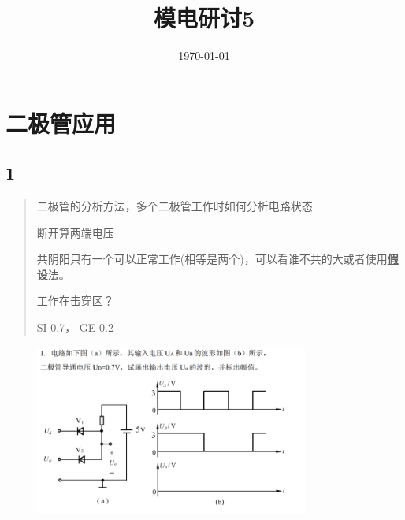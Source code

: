 \documentclass[twocolumn]{ctexart}
\title{模电研讨5}
\author{}
\date{\today}
\begin{document}
\maketitle
\newpage

\renewcommand{\baselinestretch}{1.35}
\tableofcontents
\newpage

\setlength{\parskip}{0em}
\renewcommand{\baselinestretch}{1.53}


\section{二极管应用}
\subsection{1}
\begin{quote}
{\qquad{}\ccwd\kaishu{}
二极管的分析方法，多个二极管工作时如何分析电路状态
}
\begin{description}[leftmargin=1.7cm,style=nextline,nosep]%
    \item[只有一个] 断开算两端电压
    \item[两个或者多个] 共阴阳只有一个可以正常工作(相等是两个)，可以看谁不共的大或者使用\underline{\textbf{假设}}法。
    \item[稳压二极管] 工作在击穿区？
    \item[其他] SI 0.7， GE 0.2    
\end{description}
\end{quote}

\begin{figure}[H]
            \centering
            \includegraphics[width=9cm]{img/1.1.png}
            \end{figure}
\end{document}
